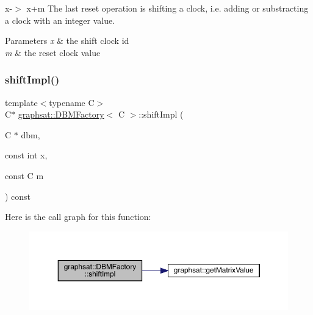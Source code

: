 x-\/$>$ x+m The last reset operation is shifting a clock, i.\+e. adding or substracting a clock with an integer value. 


\begin{DoxyParams}{Parameters}
{\em x} & the shift clock id \\
\hline
{\em m} & the reset clock value \\
\hline
\end{DoxyParams}
\mbox{\label{classgraphsat_1_1_d_b_m_factory_a9dd1531e9f728bbf69c0fa3d8545ef35}} 
\subsubsection{\texorpdfstring{shiftImpl()}{shiftImpl()}}
{\footnotesize\ttfamily template$<$typename C$>$ \\
C$\ast$ \mbox{\hyperlink{classgraphsat_1_1_d_b_m_factory}{graphsat\+::\+D\+B\+M\+Factory}}$<$ C $>$\+::shift\+Impl (\begin{DoxyParamCaption}\item[{C $\ast$}]{dbm,  }\item[{const int}]{x,  }\item[{const C}]{m }\end{DoxyParamCaption}) const\hspace{0.3cm}{\ttfamily [inline]}}

Here is the call graph for this function\+:
\nopagebreak
\begin{figure}[H]
\begin{center}
\leavevmode
\includegraphics[width=350pt]{classgraphsat_1_1_d_b_m_factory_a9dd1531e9f728bbf69c0fa3d8545ef35_cgraph}
\end{center}
\end{figure}
\mbox{\label{classgraphsat_1_1_d_b_m_factory_a8bcb9646051ac1004cccf3c6c845b20d}} 
